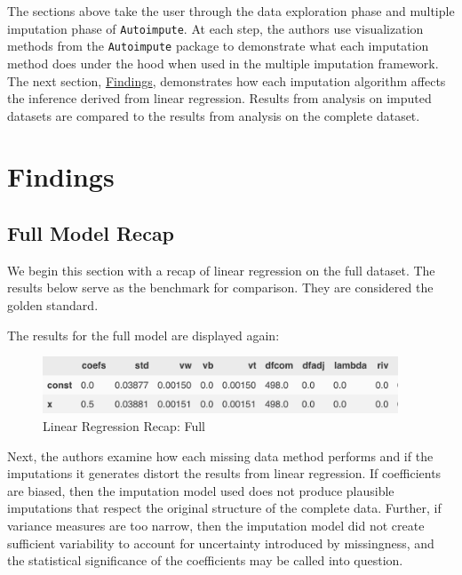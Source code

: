 \documentclass[12pt,oneside]{chicagocapstone}
\begin{document}
The sections above take the user through the data exploration phase and
multiple imputation phase of \texttt{Autoimpute}. At each step, the
authors use visualization methods from the \texttt{Autoimpute} package
to demonstrate what each imputation method does under the hood when used
in the multiple imputation framework. The next section,
\protect\hyperlink{findings}{Findings}, demonstrates how each imputation
algorithm affects the inference derived from linear regression. Results
from analysis on imputed datasets are compared to the results from
analysis on the complete dataset.

\hypertarget{findings}{\chapter*{Findings}\label{findings}}

\section*{Full Model Recap}\label{full-model-recap}

We begin this section with a recap of linear regression on the full
dataset. The results below serve as the benchmark for comparison. They
are considered the golden standard.

The results for the full model are displayed again:
\begin{figure}

{\centering \includegraphics[width=400px]{figure/full-regression} 

}

\caption{Linear Regression Recap: Full}\label{fig:full-regression-again}
\end{figure}
Next, the authors examine how each missing data method performs and if
the imputations it generates distort the results from linear regression.
If coefficients are biased, then the imputation model used does not
produce plausible imputations that respect the original structure of the
complete data. Further, if variance measures are too narrow, then the
imputation model did not create sufficient variability to account for
uncertainty introduced by missingness, and the statistical significance
of the coefficients may be called into question.
\end{document}
